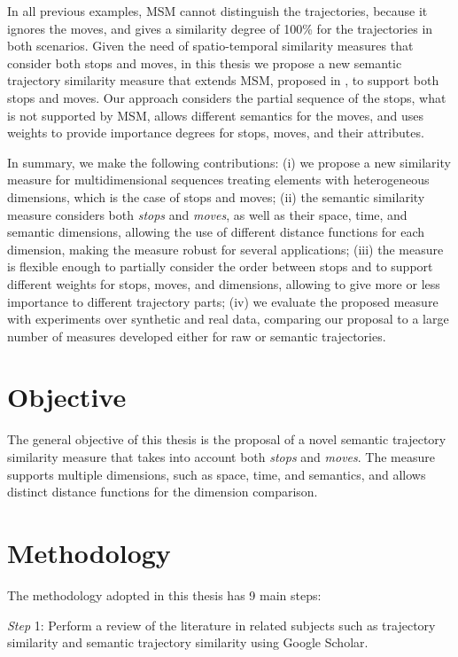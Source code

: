 In all previous examples, MSM cannot distinguish the trajectories, because it ignores the moves, and gives a similarity degree of 100\% for the trajectories in both scenarios.
Given the need of spatio-temporal similarity measures that consider both stops and moves, in this thesis we propose a new semantic trajectory similarity measure that extends MSM, proposed in \cite{Furtado:TGIS12156}, to support both stops and moves. Our approach considers the partial sequence of the stops, what is not supported by MSM, allows different semantics for the moves, and uses weights to provide importance degrees for stops, moves, and their attributes. 


In summary, we make the following contributions:
(i) we propose a new similarity measure for multidimensional sequences treating elements with heterogeneous dimensions, which is the case of stops and moves; (ii) the semantic similarity measure considers both \textit{stops} and \textit{moves}, as well as their space, time, and semantic dimensions, allowing the use of different distance functions for each dimension, making the measure robust for several applications; (iii) the measure is flexible enough to partially consider the order between stops and to support different weights for stops, moves, and dimensions, allowing to give more or less importance to different trajectory parts; (iv) we evaluate the proposed measure with experiments over synthetic and real data, comparing our proposal to a large number of measures developed either for raw or semantic trajectories.

\section{Objective}

The general objective of this thesis is the proposal of a novel semantic trajectory similarity measure that takes into account both \emph{stops} and \emph{moves}. The measure supports multiple dimensions, such as space, time, and semantics, and allows  distinct distance functions for the dimension comparison.  

\section{Methodology}
The methodology adopted in this thesis has  9 main steps:

\textit{Step} 1: Perform a review of the literature in related subjects such as trajectory similarity and semantic trajectory similarity using Google Scholar.

